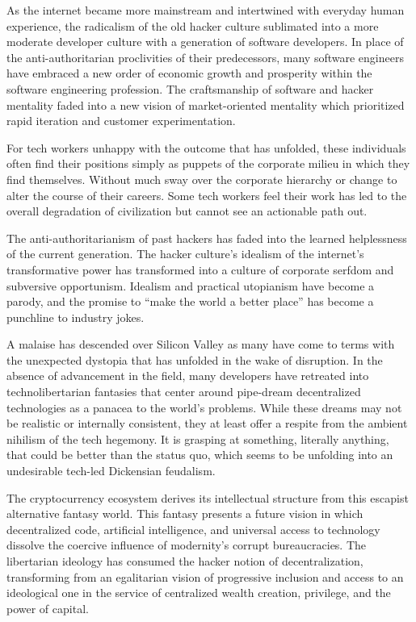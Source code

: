 As the internet became more mainstream and intertwined with everyday human
experience, the radicalism of the old hacker culture sublimated into a more
moderate developer culture with a generation of software developers. In place of
the anti-authoritarian proclivities of their predecessors, many software
engineers have embraced a new order of economic growth and prosperity within the
software engineering profession. The craftsmanship of software and hacker
mentality faded into a new vision of market-oriented mentality which prioritized
rapid iteration and customer experimentation.

For tech workers unhappy with the outcome that has unfolded, these individuals
often find their positions simply as puppets of the corporate milieu in which
they find themselves. Without much sway over the corporate hierarchy or change
to alter the course of their careers. Some tech workers feel their work has led
to the overall degradation of civilization but cannot see an actionable path
out.

The anti-authoritarianism of past hackers has faded into the learned
helplessness of the current generation. The hacker culture's idealism of the
internet's transformative power has transformed into a culture of corporate
serfdom and subversive opportunism. Idealism and practical utopianism have
become a parody, and the promise to ``make the world a better place'' has become
a punchline to industry jokes.

A malaise has descended over Silicon Valley as many have come to terms with the
unexpected dystopia that has unfolded in the wake of disruption. In the absence
of advancement in the field, many developers have retreated into
technolibertarian fantasies that center around pipe-dream decentralized
technologies as a panacea to the world's problems. While these dreams may not be
realistic or internally consistent, they at least offer a respite from the
ambient nihilism of the tech hegemony. It is grasping at something, literally
anything, that could be better than the status quo, which seems to be unfolding
into an undesirable tech-led Dickensian feudalism.

The cryptocurrency ecosystem derives its intellectual structure from this
escapist alternative fantasy world. This fantasy presents a future vision in
which decentralized code, artificial intelligence, and universal access to
technology dissolve the coercive influence of modernity's corrupt bureaucracies.
The libertarian ideology has consumed the hacker notion of decentralization,
transforming from an egalitarian vision of progressive inclusion and access to
an ideological one in the service of centralized wealth creation, privilege, and
the power of capital. \cite{narayanan_what_2013}

